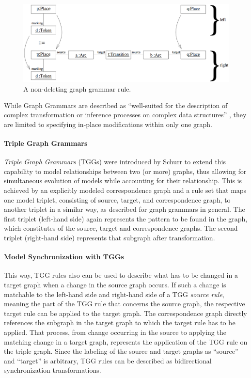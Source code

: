 \begin{figure}[h]
\centering
\includegraphics[width=14cm]{figures/graph_grammar_rule_example.png}
\caption{A non-deleting graph grammar rule. \cite{kindler_wagner_triple_graph_grammars_TGG}}
\label{fig:GraphGrammarRuleExample}
\end{figure}

While Graph Grammars are described as \enquote{well-suited for the description of complex transformation or inference processes on complex data structures} \cite{schurr_tggs_1995}, they are limited to specifying in-place modifications within only one graph.

\paragraph{Triple Graph Grammars} \emph{Triple Graph Grammars} (TGGs) were introduced by Schurr \cite{schurr_tggs_1995} to extend this capability to model relationships between two (or more) graphs, thus allowing for simultaneous evolution of models while accounting for their relationship.
This is achieved by an explicitly modeled correspondence graph and a rule set that maps one model triplet, consisting of source, target, and correspondence graph, to another triplet in a similar way, as described for graph grammars in general. The first triplet (left-hand side) again represents the pattern to be found in the graph, which constitutes of the source, target and correspondence graphs. The second triplet (right-hand side) represents that subgraph after transformation.

\paragraph{Model Synchronization with TGGs}
This way, TGG rules also can be used to describe what has to be changed in a target graph when a change in the source graph occurs. If such a change is matchable to the left-hand side and right-hand side of a TGG \emph{source rule}, meaning the part of the TGG rule that concerns the source graph, the respective target rule can be applied to the target graph. The correspondence graph directly references the subgraph in the target graph to which the target rule has to be applied.
That process, from change occurring in the source to applying the matching change in a target graph, represents the application of the TGG rule on the triple graph.
Since the labeling of the source and target graphs as \enquote{source} and \enquote{target} is arbitrary, TGG rules can be described as bidirectional synchronization transformations.

